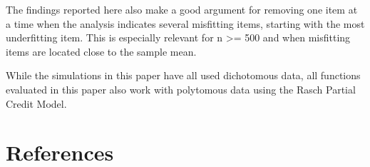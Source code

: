 \documentclass[
  letterpaper,
  DIV=11,
  numbers=noendperiod]{scrartcl}
\begin{document}
The findings reported here also make a good argument for removing one
item at a time when the analysis indicates several misfitting items,
starting with the most underfitting item. This is especially relevant
for n \textgreater= 500 and when misfitting items are located close to
the sample mean.

While the simulations in this paper have all used dichotomous data, all
functions evaluated in this paper also work with polytomous data using
the Rasch Partial Credit Model.

\section*{References}\label{references}

\label{refs}
\end{document}
